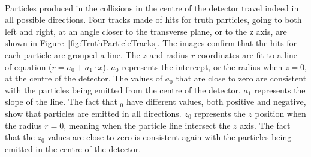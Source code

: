 
\ \\Particles produced in the collisions in the centre of the detector travel indeed in all possible directions. Four tracks made of hits for truth particles, going to both left and right, at an angle closer to the transverse plane, or to the z axis, are shown in Figure~\ref{fig:TruthParticleTracks}. The images confirm that the hits for each particle are grouped a line. The $z$ and radius $r$ coordinates are fit to a line of equation ($r = a_0 + a_1 \cdot x$). $a_0$ represents the intercept, or the radius when $z=0$, at the centre of the detector. The values of $a_0$ that are close to zero are consistent with the particles being emitted from the centre of the detector. $a_1$ represents the slope of the line. The fact that $_0$ have different values, both positive and negative, show that particles are emitted in all directions. $z_0$ represents the $z$ position when the radius $r=0$, meaning when the particle line intersect the $z$ axis. The fact that the $z_0$ values are close to zero is consistent again with the particles being emitted in the centre of the detector.

